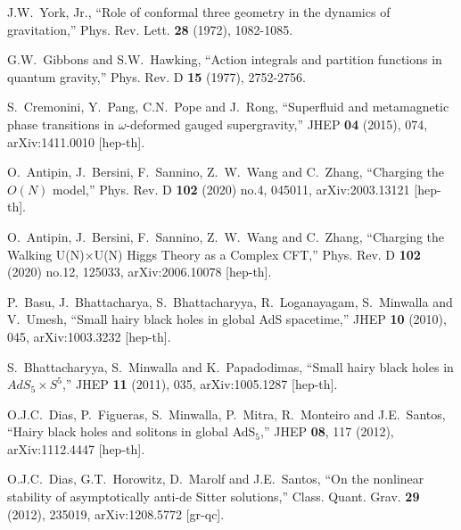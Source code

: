 \documentclass[11pt]{article}
\begin{document}
\begin{thebibliography}{99}
J.W.~York, Jr.,
``Role of conformal three geometry in the dynamics of gravitation,''
Phys. Rev. Lett. \textbf{28} (1972), 1082-1085.

G.W.~Gibbons and S.W.~Hawking,
``Action integrals and partition functions in quantum gravity,''
Phys. Rev. D \textbf{15} (1977), 2752-2756.

S.~Cremonini, Y.~Pang, C.N.~Pope and J.~Rong,
``Superfluid and metamagnetic phase transitions in $\omega$-deformed gauged supergravity,''
JHEP \textbf{04} (2015), 074, arXiv:1411.0010 [hep-th].

O.~Antipin, J.~Bersini, F.~Sannino, Z.~W.~Wang and C.~Zhang,
``Charging the $O(N)$ model,''
Phys. Rev. D \textbf{102} (2020) no.4, 045011, arXiv:2003.13121 [hep-th].

O.~Antipin, J.~Bersini, F.~Sannino, Z.~W.~Wang and C.~Zhang,
``Charging the Walking U(N)$\times$U(N) Higgs Theory as a Complex CFT,''
Phys. Rev. D \textbf{102} (2020) no.12, 125033, arXiv:2006.10078 [hep-th].

P.~Basu, J.~Bhattacharya, S.~Bhattacharyya, R.~Loganayagam, S.~Minwalla and V.~Umesh,
``Small hairy black holes in global AdS spacetime,''
JHEP \textbf{10} (2010), 045, arXiv:1003.3232 [hep-th].

S.~Bhattacharyya, S.~Minwalla and K.~Papadodimas,
``Small hairy black holes in $AdS_5 \times S^5$,''
JHEP \textbf{11} (2011), 035, arXiv:1005.1287 [hep-th].

O.J.C.~Dias, P.~Figueras, S.~Minwalla, P.~Mitra, R.~Monteiro and J.E.~Santos,
``Hairy black holes and solitons in global AdS$_5$,''
JHEP \textbf{08}, 117 (2012), arXiv:1112.4447 [hep-th].


O.J.C.~Dias, G.T.~Horowitz, D.~Marolf and J.E.~Santos,
``On the nonlinear stability of asymptotically anti-de Sitter solutions,''
Class. Quant. Grav. \textbf{29} (2012), 235019, arXiv:1208.5772 [gr-qc].

\end{thebibliography}
\end{document}
